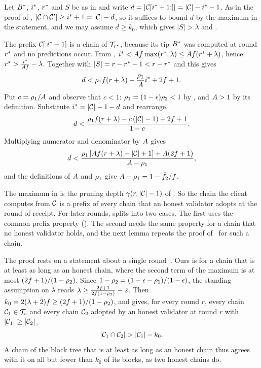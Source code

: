 \begin{proofof}{}
    Let $B^{*}$, $i^{*}$, $r^{*}$ and $S$ be as in  and write
    $d=\lvert \mathcal{C}[i^{*}+1{:}]\rvert=\lvert \mathcal{C}\rvert-i^{*}-1$. As in the proof of
    , $\lvert \mathcal{C}\cap\mathcal{C}'\rvert\ge i^{*}+1=\lvert \mathcal{C}\rvert-d$, so it
    suffices to bound $d$ by the maximum in the statement, and we may assume
    $d\ge k_0$, which gives $|S|>\lambda$ and .

    The prefix $\mathcal{C}[{:}i^{*}+1]$ is a chain of $\mathcal{T}_{r^{*}}$, because its tip
    $B^{*}$ was computed at round $r^{*}$ and no predictions occur. From
    , $i^{*}<A f\max(r^{*},\lambda)\le A f(r^{*}+\lambda)$,
    hence $r^{*}>\frac{i^{*}}{A f}-\lambda$. Together with
    $|S|=r-r^{*}-1<r-r^{*}$ and  this gives
    \[
        d < \rho_1 f(r+\lambda) - \frac{\rho_1}{A}i^{*} + 2f+1 .
    \]
    Put $c=\rho_1/A$ and observe that $c<1$: $\rho_1=(1-\epsilon)\rho_2<1$
    by , and $A>1$ by its definition. Substitute
    $i^{*}=\lvert \mathcal{C}\rvert-1-d$ and rearrange,
    \[
        d < \frac{\rho_1 f(r+\lambda)-c\,(\lvert \mathcal{C}\rvert-1)+2f+1}{1-c} .
    \]
    Multiplying numerator and denominator by $A$ gives
    \[
        d < \frac{\rho_1\left[A f(r+\lambda)-\lvert \mathcal{C}\rvert+1\right]+A(2f+1)}{A-\rho_1},
    \]
    and the definitions of $A$ and $\rho_1$ give
    $A-\rho_1=1-\bar{f}_2/f$.
\end{proofof}

The maximum in  is the pruning depth $\gamma(r,\lvert \mathcal{C}\rvert-1)$ of
. So the chain the client computes from $\mathcal{C}$ is a prefix of
every chain that an honest validator adopts at the round of receipt. For later
rounds,  splits into two cases. The first uses the common
prefix property (). The second needs the same property
for a chain that no honest validator holds, and the next lemma repeats the proof
of~\cite[Theorem 4.10]{gkl24} for such a chain.

The proof rests on a statement about a single round~\cite[Lemma
4.9]{gkl24}. Ours is  for a chain that is at least as long as
an honest chain, where the second term of the maximum is at most
$(2f+1)/(1-\rho_2)$. Since $1-\rho_2=(1-\epsilon-\rho_1)/(1-\epsilon)$,
the standing assumption on $\lambda$ reads
$\lambda\ge\frac{2f+1}{2f(1-\rho_2)}-2$. Then
$k_0=2(\lambda+2)f\ge(2f+1)/(1-\rho_2)$, and  gives, for
every round $r$, every chain $\mathcal{C}_1\in\mathcal{T}_r$ and every chain $\mathcal{C}_2$ adopted
by an honest validator at round $r$ with $\lvert \mathcal{C}_1\rvert\ge\lvert \mathcal{C}_2\rvert$,
\begin{equation}\label{eq.longer}
    \lvert \mathcal{C}_1\cap\mathcal{C}_2\rvert > \lvert \mathcal{C}_1\rvert-k_0 .
\end{equation}
A chain of the block tree that is at least as long as an honest chain thus
agrees with it on all but fewer than $k_0$ of its blocks, as two honest chains
do.


